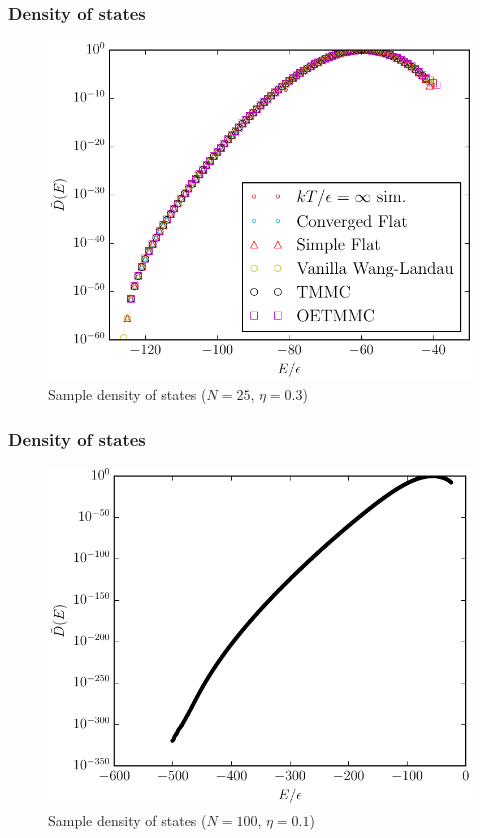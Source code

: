 \documentclass{beamer}
\begin{document}
\begin{frame}
  \frametitle{Density of states}
  \begin{figure}
    \centering
    \includegraphics[height=0.75\textheight]
    {figs/dos-poster-example.pdf}
    \caption{Sample density of states ($N=25$, $\eta=0.3$)}
  \end{figure}
\end{frame}

\begin{frame}
  \frametitle{Density of states}
  \begin{figure}
    \centering
    \includegraphics[height=0.75\textheight]
    {figs/dos-thesis-example.pdf}
    \caption{Sample density of states ($N=100$, $\eta=0.1$)}
  \end{figure}
\end{frame}
\end{document}
